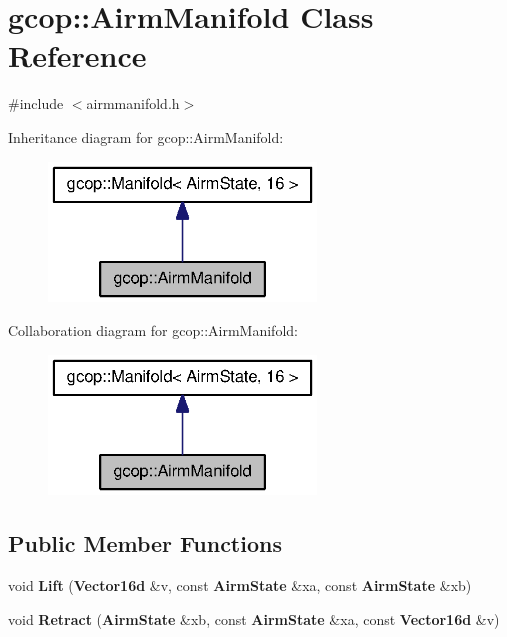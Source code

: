 \section{gcop\-:\-:\-Airm\-Manifold \-Class \-Reference}
\label{classgcop_1_1AirmManifold}


{\ttfamily \#include $<$airmmanifold.\-h$>$}



\-Inheritance diagram for gcop\-:\-:\-Airm\-Manifold\-:\nopagebreak
\begin{figure}[H]
\begin{center}
\leavevmode
\includegraphics[width=202pt]{classgcop_1_1AirmManifold__inherit__graph}
\end{center}
\end{figure}


\-Collaboration diagram for gcop\-:\-:\-Airm\-Manifold\-:\nopagebreak
\begin{figure}[H]
\begin{center}
\leavevmode
\includegraphics[width=202pt]{classgcop_1_1AirmManifold__coll__graph}
\end{center}
\end{figure}
\subsection*{\-Public \-Member \-Functions}
\begin{DoxyCompactItemize}
\item 
void {\bf \-Lift} ({\bf \-Vector16d} \&v, const {\bf \-Airm\-State} \&xa, const {\bf \-Airm\-State} \&xb)
\item 
void {\bf \-Retract} ({\bf \-Airm\-State} \&xb, const {\bf \-Airm\-State} \&xa, const {\bf \-Vector16d} \&v)
\end{DoxyCompactItemize}
